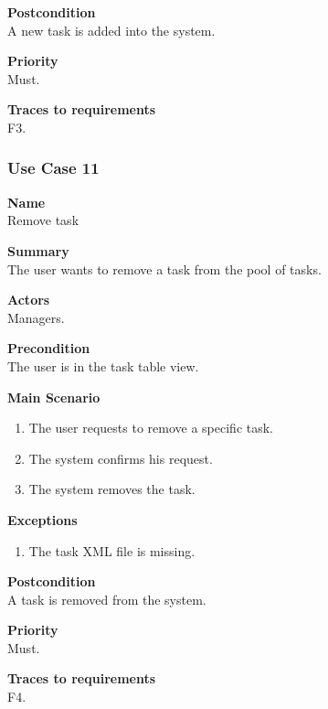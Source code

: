 \documentclass[12pt]{article}
\begin{document}
\noindent
{\bf Postcondition}\\
A new task is added into the system.

\noindent
{\bf Priority}\\
Must.

\noindent
{\bf Traces to requirements}\\
F3.

\subsubsection{Use Case 11} \label{uc:11}

\noindent
{\bf Name}\\
Remove task

\noindent
{\bf Summary}\\
The user wants to remove a task from the pool of tasks.

\noindent
{\bf Actors}\\
Managers.

\noindent
{\bf Precondition}\\
The user is in the task table view.

\noindent
{\bf Main Scenario}\\
\vspace*{-0.35in}
\begin{enumerate}
\item The user requests to remove a specific task.
\vspace*{-0.1in}
\item The system confirms his request.
\vspace*{-0.1in}
\item The system removes the task.
\end{enumerate}
\vspace*{-0.1in}

\noindent
{\bf Exceptions}\\
\vspace*{-0.35in}
\begin{enumerate}
\item The task XML file is missing.
\end{enumerate}
\vspace*{-0.1in}

\noindent
{\bf Postcondition}\\
A task is removed from the system.

\noindent
{\bf Priority}\\
Must.

\noindent
{\bf Traces to requirements}\\
F4.
\end{document}
